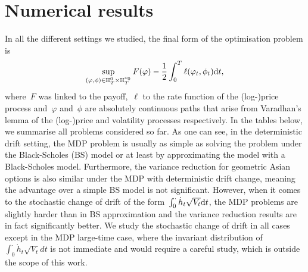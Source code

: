 \section{Numerical results}\label{sec:Num_results}
In all the different settings we studied, the final form of the optimisation problem is
$$
\sup_{(\varphi, \phi)\in \mathbb{H}_T^0\times \mathbb{H}_T^{v_0}}F(\varphi) - \frac{1}{2}\int_0^T\ell(\varphi_t,\phi_t)\mathrm{d} t,
$$
where~$F$ was linked to the payoff,~$\ell$ to the rate function of the (log-)price process and~$\varphi$ and~$\phi$ are absolutely continuous paths that arise from Varadhan's lemma of the (log-)price and volatility processes respectively.
In the tables below, we summarise all problems considered so far. As one can see, in the deterministic drift setting, the MDP problem is usually as simple as solving the problem under the Black-Scholes (BS) model or at least by approximating the model with a Black-Scholes model. Furthermore, the variance reduction for geometric Asian options is also similar under the MDP with deterministic drift change, meaning the advantage over a simple BS model is not significant. However, when it comes to the stochastic change of drift of the form~$\int_0^\cdot\dot{h}_t\sqrt{V_t}\mathrm{d} t$, the MDP problems are slightly harder than in BS approximation and the variance reduction results are in fact significantly better. We study the stochastic change of drift in all cases except in the MDP large-time case, where the invariant distribution of~$\int_0^\cdot \dot{h}_{t}\sqrt{V_t}dt$ is not immediate and would require a careful study, which is outside the scope of this work.
\begin{table}[H]
\centering
\caption{Summary of the optimisations with \textit{deterministic} change of drift. %
}
\end{table}

